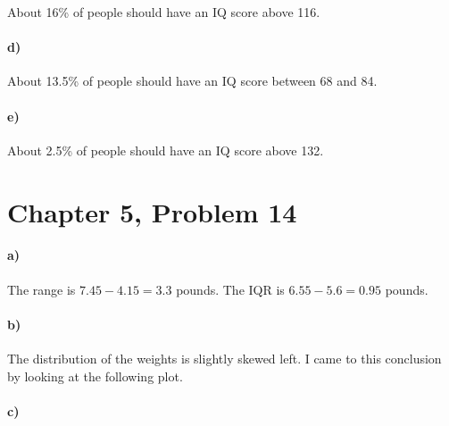 \documentclass[12pt]{article}
\begin{document}
About 16\% of people should have an IQ score above 116.

\paragraph{d)}

About 13.5\% of people should have an IQ score between 68 and 84.

\paragraph{e)}

About 2.5\% of people should have an IQ score above 132.

\section*{Chapter 5, Problem 14}

\paragraph{a)}

The range is \(7.45-4.15=3.3\) pounds. The IQR is \(6.55-5.6=0.95\) pounds.

\paragraph{b)}

The distribution of the weights is slightly skewed left. I came to this conclusion by looking at the
following plot.
\begin{center}
\end{center}

\paragraph{c)}
\end{document}
